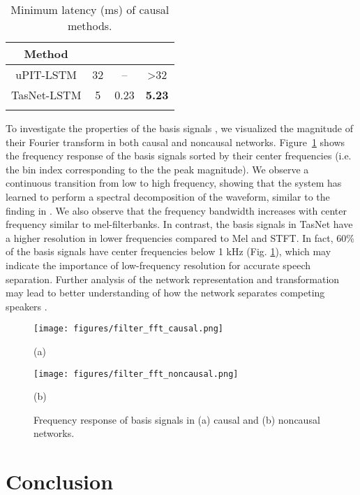 \documentclass{article}
\def\thline{\noalign{\hrule height 1.0pt}}
\begin{document}
\begin{table}[!t]
\centering
\caption{Minimum latency (ms) of causal methods.}
\vspace{0.2cm}
\label{tab:speed}
\begin{tabular}{c|c|c|c}
\thline
Method &  &  & \\
\hline
uPIT-LSTM \cite{kolbaek2017multitalker} & 32 & -- & \textgreater32\\
TasNet-LSTM & 5 & 0.23 & \bf{5.23} \\
\thline
\end{tabular}
\end{table}

To investigate the properties of the basis signals , we visualized the magnitude of their Fourier transform in both causal and noncausal networks. Figure~\ref{fig:basis} shows the frequency response of the basis signals sorted by their center frequencies (i.e. the bin index corresponding to the the peak magnitude). We observe a continuous transition from low to high frequency, showing that the system has learned to perform a spectral decomposition of the waveform, similar to the finding in \cite{sainath2015learning}. We also observe that the frequency bandwidth increases with center frequency similar to mel-filterbanks. In contrast, the basis signals in TasNet have a higher resolution in lower frequencies compared to Mel and STFT. In fact, 60\% of the basis signals have center frequencies below 1 kHz (Fig. \ref{fig:basis}), which may indicate the importance of low-frequency resolution for accurate speech separation. Further analysis of the network representation and transformation may lead to better understanding of how the network separates competing speakers \cite{nagamine2017understanding}.
\begin{figure}[!htp]

\begin{minipage}[b]{1.0\linewidth}
  \centering
  \centerline{\texttt{[image: figures/filter\_fft\_causal.png]}}
\centerline{(a)}\medskip
\end{minipage}
\hfill
\begin{minipage}[b]{1.0\linewidth}
  \centering
  \centerline{\texttt{[image: figures/filter\_fft\_noncausal.png]}}
\centerline{(b)}\medskip
\end{minipage}
\caption{Frequency response of basis signals in (a) causal and (b) noncausal networks.}
\label{fig:basis}
\end{figure} 
\section{Conclusion}
\label{sec:conclude}
\end{document}
